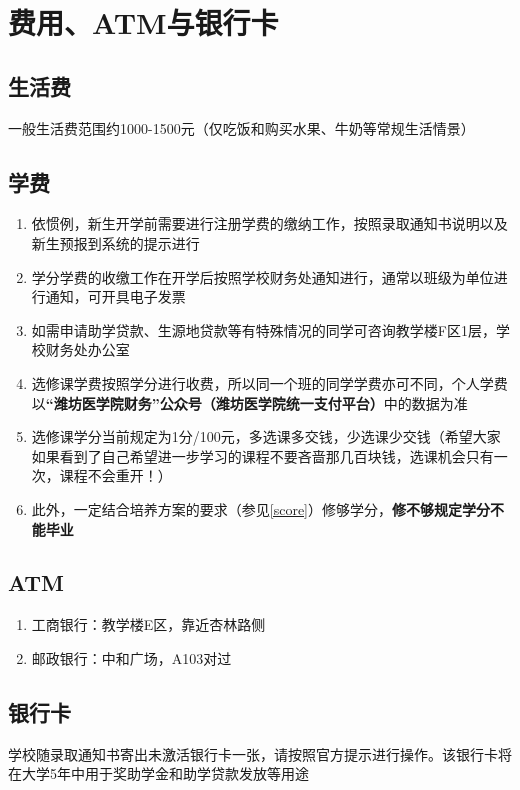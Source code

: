 \chapter[费用、ATM与银行卡]{费用、ATM与银行卡}
\section[生活费]{生活费}
一般生活费范围约1000-1500元（仅吃饭和购买水果、牛奶等常规生活情景）

\section[学费]{学费\footnotemark}
\begin{enumerate}
    \item 依惯例，新生开学前需要进行注册学费的缴纳工作，按照录取通知书说明以及新生预报到系统\footnotemark 的提示进行
    \item 学分学费的收缴工作在开学后按照学校财务处通知进行，通常以班级为单位进行通知，可开具电子发票
    \item 如需申请助学贷款、生源地贷款等有特殊情况的同学可咨询教学楼F区1层，学校财务处办公室
    \item 选修课学费按照学分进行收费，所以同一个班的同学学费亦可不同，个人学费以\textbf{“潍坊医学院财务”公众号（潍坊医学院统一支付平台）}中的数据为准
    \item 选修课学分当前规定为1分/100元，多选课多交钱，少选课少交钱（希望大家如果看到了自己希望进一步学习的课程不要吝啬那几百块钱，选课机会只有一次，课程不会重开！）
    \item 此外，一定结合培养方案的要求（参见\uline{\ref{score}}）修够学分，\textbf{修不够规定学分不能毕业}
\end{enumerate}

\section[ATM]{ATM\footnotemark}
\begin{enumerate}
    \item 工商银行：教学楼E区，靠近杏林路侧
    \item 邮政银行：中和广场，A103对过
\end{enumerate}

\section[银行卡]{银行卡}
学校随录取通知书寄出未激活银行卡一张，请按照官方提示进行操作。该银行卡将在大学5年中用于奖助学金和助学贷款发放等用途
